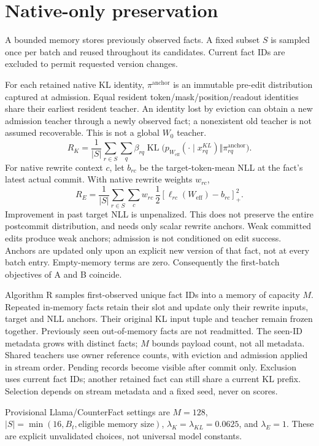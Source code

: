 \documentclass[11pt]{article}
\newcommand{\KL}{\operatorname{KL}}
\newcommand{\pos}[1]{\left[#1\right]_+}
\begin{document}
\section{Native-only preservation}
A bounded memory stores previously observed facts. A fixed subset $S$
is sampled once per batch and reused throughout its candidates.
Current fact IDs are excluded to permit requested version changes.

For each retained native KL identity, $\pi^{\mathrm{anchor}}$ is an
immutable pre-edit distribution captured at admission. Equal resident
token/mask/position/readout identities share their earliest resident
teacher. An identity lost by eviction can obtain a new admission teacher
through a newly observed fact; a nonexistent old teacher is not assumed
recoverable. This is not a global $W_0$ teacher.
\[
R_K=\frac1{|S|}\sum_{r\in S}\sum_q\beta_{rq}
\KL\big(p_{W_{\mathrm{eff}}}(\cdot\mid x^{KL}_{rq})
\Vert\pi^{\mathrm{anchor}}_{rq}\big).
\]
For native rewrite context $c$, let $b_{rc}$ be the target-token-mean NLL
at the fact's latest actual commit. With native rewrite weights $w_{rc}$,
\[
R_E=\frac1{|S|}\sum_{r\in S}\sum_c w_{rc}\,
\frac12\pos{\ell_{rc}(W_{\mathrm{eff}})-b_{rc}}^2.
\]
Improvement in past target NLL is unpenalized. This does not preserve the
entire postcommit distribution, and needs only scalar rewrite anchors.
Weak committed edits produce weak anchors; admission is not conditioned
on edit success. Anchors are updated only upon an explicit new version
of that fact, not at every batch entry. Empty-memory terms are zero.
Consequently the first-batch objectives of A and B coincide.

Algorithm R samples first-observed unique fact IDs into a memory of
capacity $M$. Repeated in-memory facts retain their slot and update only
their rewrite inputs, target and NLL anchors. Their original KL input
tuple and teacher remain frozen together. Previously seen out-of-memory
facts are not readmitted. The seen-ID metadata grows with distinct facts;
$M$ bounds payload count, not all metadata. Shared teachers use owner
reference counts, with eviction and admission applied in stream order.
Pending records become visible after commit only. Exclusion uses current
fact IDs; another retained fact can still share a current KL prefix.
Selection depends on stream metadata and a fixed seed, never on scores.

Provisional Llama/CounterFact settings are $M=128$,
$|S|=\min(16,B_t,\text{eligible memory size})$,
$\lambda_K=\lambda_{KL}=0.0625$, and $\lambda_E=1$.
These are explicit unvalidated choices, not universal model constants.
\end{document}
